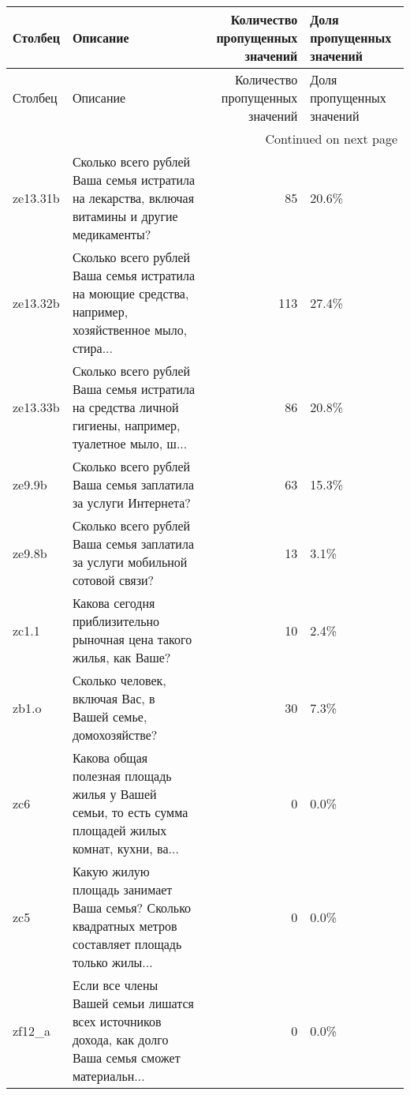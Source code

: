 \begin{longtable}{llrl}
\toprule
 Столбец &                                                                                             Описание &  Количество пропущенных значений & Доля пропущенных значений \\
\midrule
\endfirsthead

\toprule
 Столбец &                                                                                             Описание &  Количество пропущенных значений & Доля пропущенных значений \\
\midrule
\endhead
\midrule
\multicolumn{4}{r}{{Continued on next page}} \\
\midrule
\endfoot

\bottomrule
\endlastfoot
ze13.31b &       Сколько всего рублей Ваша семья истратила на лекарства, включая витамины и другие медикаменты? &                               85 &                     20.6\% \\
ze13.32b & Сколько всего рублей Ваша семья истратила на моющие средства, например, хозяйственное мыло, стира... &                              113 &                     27.4\% \\
ze13.33b & Сколько всего рублей Ваша семья истратила на средства личной гигиены, например, туалетное мыло, ш... &                               86 &                     20.8\% \\
  ze9.9b &                                       Сколько всего рублей Ваша семья заплатила за услуги Интернета? &                               63 &                     15.3\% \\
  ze9.8b &                        Сколько всего рублей Ваша семья заплатила за услуги мобильной сотовой связи?  &                               13 &                      3.1\% \\
   zc1.1 &                                  Какова сегодня приблизительно рыночная цена такого жилья, как Ваше? &                               10 &                      2.4\% \\
   zb1.o &                                          Сколько человек, включая Вас, в Вашей семье, домохозяйстве? &                               30 &                      7.3\% \\
     zc6 & Какова общая полезная площадь жилья у Вашей семьи, то есть сумма площадей жилых комнат, кухни, ва... &                                0 &                      0.0\% \\
     zc5 & Какую жилую площадь занимает Ваша семья? Сколько квадратных метров составляет площадь только жилы... &                                0 &                      0.0\% \\
  zf12\_a & Если все члены Вашей семьи лишатся всех источников дохода, как долго Ваша семья сможет материальн... &                                0 &                      0.0\% \\
\end{longtable}
